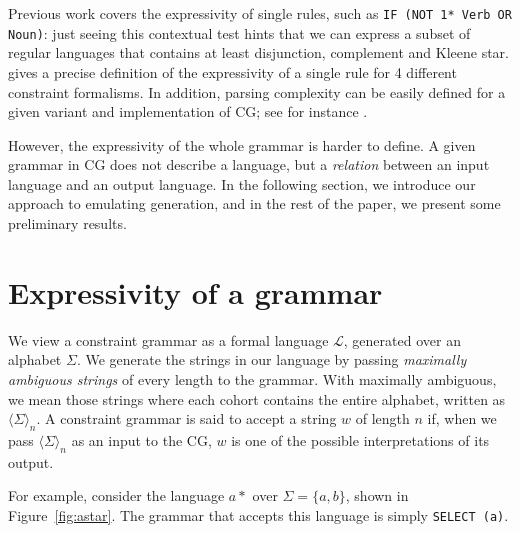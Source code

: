 \documentclass[11pt]{article}
\def\t#1{\texttt{#1}}
\def\maxAmb#1{$\langle \Sigma \rangle_#1$}
\begin{document}
Previous work covers the expressivity of single rules, such as \texttt{IF (NOT 1* Verb OR Noun)}: just seeing this contextual test hints that we can express a subset of regular languages that contains at least disjunction, complement and Kleene star. 
 gives a precise definition of the expressivity of a single rule for 4 different constraint formalisms. In addition, parsing complexity can be easily defined for a given variant and implementation of CG; see for instance .

However, the expressivity of the whole grammar is harder to define. 
A given grammar in CG does not describe a language, but a \emph{relation} between an input language and an output language. 
In the following section, we introduce our approach to emulating generation, and in the rest of the paper, we present some preliminary results.

\section{Expressivity of a grammar}

We view a constraint grammar as a formal language $\mathcal{L}$, generated over an 
alphabet $\Sigma$. We generate the strings in our language by passing 
\emph{maximally ambiguous strings} of every length to the grammar. 
With maximally ambiguous, we mean those strings where each cohort contains the 
entire alphabet, written as \maxAmb{n}. 
A constraint grammar is said to accept a string $w$ of length $n$ if, 
when we pass \maxAmb{n} as an input to the CG,
$w$ is one of the possible interpretations of its output.

For example, consider the language $a*$ over $\Sigma = \{a,b\}$,
shown in Figure~\ref{fig:astar}.
The grammar that accepts this language is simply \texttt{SELECT (a)}.

\def\wwf{\t{"<w>"}}
\def\swf{\t{"<s>"}}
\def\alm{\t{"a" a}~~~~~~}
\def\blm{\t{"b" b}~~~~~~}
\end{document}
